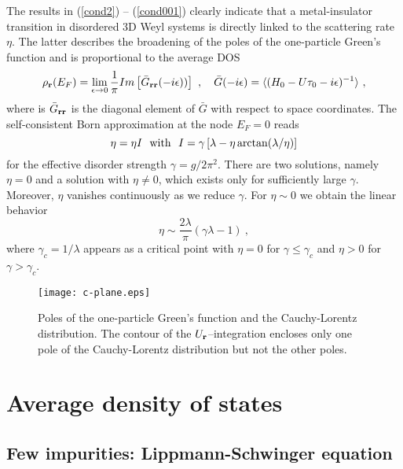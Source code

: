 \documentclass[aps]{revtex4}
\def\beq{\begin{equation}}
\def\eeq{\end{equation}}
\def\br{{\bf r}}
\begin{document}
The results in (\ref{cond2}) -- (\ref{cond001}) clearly indicate that a metal-insulator transition 
in disordered 3D Weyl systems is directly linked to the scattering rate $\eta$. The latter describes 
the broadening of the poles of the one-particle Green's function and is proportional to 
the average DOS
\beq
\rho_{\br}(E_F)=\lim_{\epsilon\to 0}\frac{1}{\pi}Im\left[{\bar G}_{\br\br}(-i\epsilon))\right]
\ , \ \ \ 
{\bar G}(-i\epsilon)
=\langle(H_0-U\tau_0-i\epsilon)^{-1}\rangle
\ ,
\label{av_dos}
\eeq
where is ${\bar G}_{\br\br}$ is the diagonal element of ${\bar G}$
with respect to space coordinates.
The self-consistent Born approximation \cite{fradkin86a,ziegler16} at the node $E_F=0$ reads 
\beq
\eta=\eta I
\\ \ \ {\rm with}\ \  
I=\gamma\left[
\lambda-\eta\arctan(\lambda/\eta)\right] %
\eeq
for the effective disorder strength $\gamma=g/2\pi^2$.
There are two solutions, namely $\eta=0$ and a solution with $\eta\ne0$,
which exists only for
sufficiently large $\gamma$. Moreover, $\eta$ vanishes continuously as we reduce $\gamma$. 
For $\eta\sim 0$ we obtain the linear behavior
\beq
\eta\sim\frac{2\lambda}{\pi}(\gamma\lambda -1)
\ ,
\label{scba2}
\eeq
where $\gamma_c=1/\lambda$ appears as a critical point with $\eta=0$ for $\gamma\le \gamma_c$
and $\eta>0$ for $\gamma>\gamma_c$.

\begin{figure*}[t]
\texttt{[image: c-plane.eps]}
\caption{
Poles of the one-particle Green's function and the Cauchy-Lorentz distribution. 
The contour of the $U_\br$--integration encloses only one pole of the Cauchy-Lorentz 
distribution but not the other poles.  
}
\label{fig:c-plane}
\end{figure*}


\section{Average density of states}


\subsection{Few impurities: Lippmann-Schwinger equation}
\end{document}
